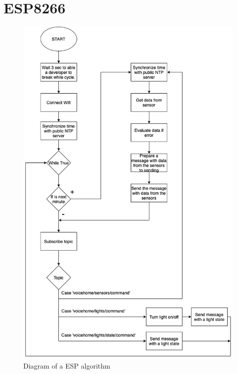 \chapter{ESP8266} \label{app:esp}

\begin{figure}[H]
    \centering
    \includegraphics[width=\textwidth]{img/esp_diagram.png}
    \caption{Diagram of a ESP algorithm}
    \label{fig:esp_diagram}
\end{figure}